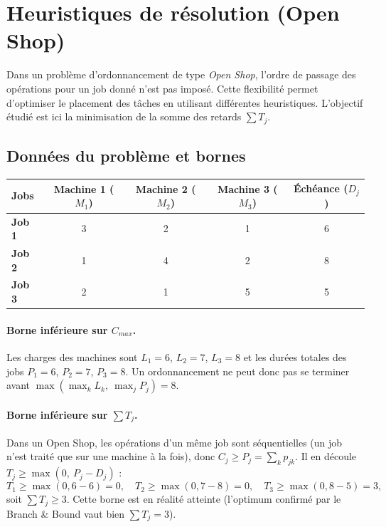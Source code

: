 \section{Heuristiques de résolution (Open Shop)}

Dans un problème d'ordonnancement de type \textit{Open Shop}, l'ordre de passage des opérations pour un job donné n'est pas imposé. Cette flexibilité permet d'optimiser le placement des tâches en utilisant différentes heuristiques. L'objectif étudié est ici la minimisation de la somme des retards $\sum T_j$.

\subsection{Données du problème et bornes}

\begin{table}[H]
\centering
\begin{tabular}{lcccc}
\toprule
\textbf{Jobs} & \textbf{Machine 1 ($M_1$)} & \textbf{Machine 2 ($M_2$)} & \textbf{Machine 3 ($M_3$)} & \textbf{Échéance ($D_j$)} \\
\midrule
\textbf{Job 1} & 3 & 2 & 1 & 6 \\
\textbf{Job 2} & 1 & 4 & 2 & 8 \\
\textbf{Job 3} & 2 & 1 & 5 & 5 \\
\bottomrule
\end{tabular}
\end{table}

\paragraph{Borne inférieure sur $C_{max}$.} Les charges des machines sont $L_1 = 6$, $L_2 = 7$, $L_3 = 8$ et les durées totales des jobs $P_1 = 6$, $P_2 = 7$, $P_3 = 8$. Un ordonnancement ne peut donc pas se terminer avant $\max(\max_k L_k,\ \max_j P_j) = 8$.

\paragraph{Borne inférieure sur $\sum T_j$.} Dans un Open Shop, les opérations d'un même job sont séquentielles (un job n'est traité que sur une machine à la fois), donc $C_j \geq P_j = \sum_k p_{jk}$. Il en découle $T_j \geq \max(0,\ P_j - D_j)$ :
\[
T_1 \geq \max(0, 6-6) = 0,\quad T_2 \geq \max(0, 7-8) = 0,\quad T_3 \geq \max(0, 8-5) = 3,
\]
soit $\sum T_j \geq 3$. Cette borne est en réalité atteinte (l'optimum confirmé par le Branch \& Bound vaut bien $\sum T_j = 3$).

